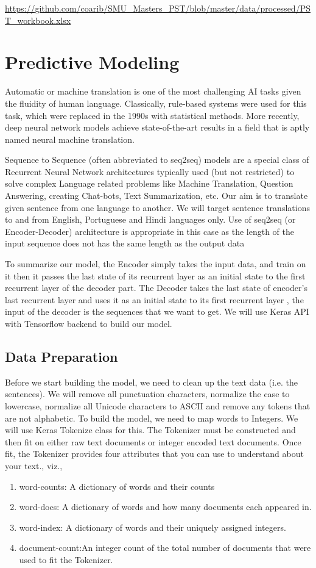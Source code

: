 \documentclass[runningheads]{llncs}
\begin{document}
\url{https://github.com/coarib/SMU_Masters_PST/blob/master/data/processed/PST_workbook.xlsx}
	
	\section{Predictive Modeling}
	Automatic or machine translation is one of the most challenging AI tasks given the fluidity of human language. Classically, rule-based systems were used for this task, which were replaced in the 1990s with statistical methods. More recently, deep neural network models achieve state-of-the-art results in a field that is aptly named neural machine translation. ~\cite{ref_url16}
	
	Sequence to Sequence (often abbreviated to seq2seq) models are a special class of Recurrent Neural Network architectures typically used (but not restricted) to solve complex Language related problems like Machine Translation, Question Answering, creating Chat-bots, Text Summarization, etc. Our aim is to translate given sentence from one language to another. We will target sentence translations to and from English, Portuguese and  Hindi languages only. Use of seq2seq (or Encoder-Decoder) architecture is appropriate in this case as the length of the input sequence  does not has the same length as the output data
	
	To summarize our model, the Encoder simply takes the input data, and train on it then it passes the last state of its recurrent layer as an initial state to the first recurrent layer of the decoder part. The Decoder takes the last state of encoder’s last recurrent layer and uses it as an initial state to its first recurrent layer , the input of the decoder is the sequences that we want to get. We will use Keras API with Tensorflow backend to build our model.


	\subsection{Data Preparation}
	Before we start building the model, we need to clean up the text data (i.e. the sentences). We will remove all punctuation characters, normalize the case to lowercase, normalize all Unicode characters to ASCII and remove any tokens that are not alphabetic. To build the model, we need to map words to Integers. We will use Keras Tokenize class for this. The Tokenizer must be constructed and then fit on either raw text documents or integer encoded text documents. Once fit, the Tokenizer provides four attributes that you can use to understand about your text., viz.,
					\begin{enumerate}
						 \item word-counts: A dictionary of words and their counts
						 \item word-docs: A dictionary of words and how many documents each appeared in.
						\item word-index: A dictionary of words and their uniquely assigned integers.
						\item document-count:An integer count of the total number of documents that were used to fit the Tokenizer.
					\end{enumerate}
	
\end{document}
